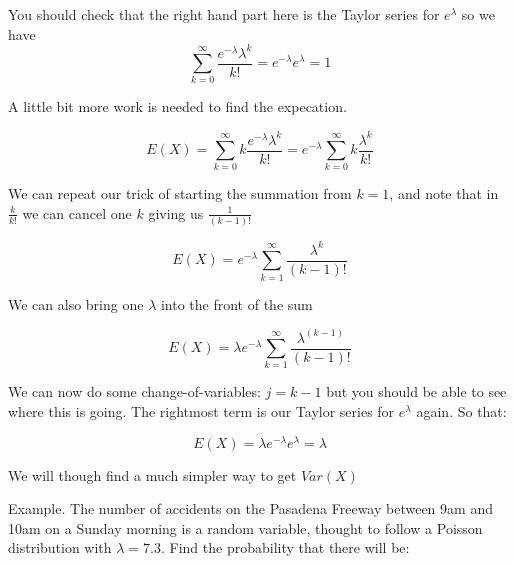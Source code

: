\documentclass[12pt]{extbook}
\begin{document}
You should check that the right hand part here is the Taylor series for $e^{\lambda}$ so we have
\begin{displaymath}
\sum_{k=0}^{\infty} \frac{e^{-\lambda}\lambda^k}{k!} = e^{-\lambda}e^{\lambda} = 1
\end{displaymath}



A little bit more work is needed to find the expecation.

\begin{displaymath}
E(X) = \sum_{k=0}^{\infty} k \frac{e^{-\lambda}\lambda^k}{k!} = e^{-\lambda} \sum_{k=0}^{\infty} k \frac{\lambda^k}{k!}
\end{displaymath}

We can repeat our trick of starting the summation from $k=1$, and note that in $\frac{k}{k!}$ we can cancel one $k$ giving us $\frac{1}{(k-1)!}$

\begin{displaymath}
E(X)  = e^{-\lambda} \sum_{k=1}^{\infty}  \frac{\lambda^k}{(k-1)!}
\end{displaymath}

We can also bring one $\lambda$ into the front of the sum

\begin{displaymath}
E(X)  = \lambda e^{-\lambda} \sum_{k=1}^{\infty}  \frac{\lambda^{(k-1)}}{(k-1)!}
\end{displaymath}

We can now do some change-of-variables: $j=k-1$ but you should be able to see where this is going.   The rightmost term is our Taylor series for $e^{\lambda}$ again.   So that:

\begin{displaymath}
E(X) = \lambda e^{-\lambda} e^{\lambda} = \lambda
\end{displaymath} 

We will though find a much simpler way to get $Var(X)$






Example. The number of accidents on the Pasadena Freeway between 9am and 10am on a Sunday morning is a random variable, thought to follow a Poisson distribution with $\lambda = 7.3$.   Find the probability that there will be:
\end{document}

